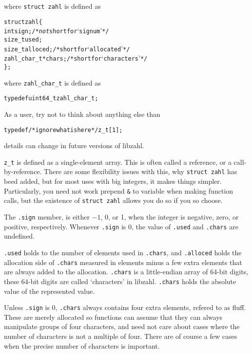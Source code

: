 \noindent
where {\tt struct zahl} is defined as

\begin{alltt}
   struct zahl \{
       int sign;            \textcolor{c}{/* \textrm{\emph{not} short for `signum'} */}
       size_t used;
       size_t alloced;      \textcolor{c}{/* \textrm{short for `allocated'} */}
       zahl_char_t *chars;  \textcolor{c}{/* \textrm{short for `characters'} */}
   \};
\end{alltt}

\noindent
where {\tt zahl\_char\_t} is defined as

\begin{alltt}
   typedef uint64_t zahl_char_t;
\end{alltt}

\noindent
As a user, try not to think about anything else than

\begin{alltt}
   typedef \textcolor{c}{/* \textrm{ignore what is here} */} z_t[1];
\end{alltt}

\noindent
details can change in future versions of libzahl.

{\tt z\_t} is defined as a single-element array. This
is often called a reference, or a call-by-reference.
There are some flexibility issues with this, why
{\tt struct zahl} has beed added, but for most uses
with big integers, it makes things simpler. Particularly,
you need not work prepend {\tt \&} to variable when making
function calls, but the existence of {\tt struct zahl}
allows you do so if you so choose.

The {\tt .sign} member, is either $-1$, 0, or 1,
when the integer is negative, zero, or positive,
respectively. Whenever {\tt .sign} is 0, the value
of {\tt .used} and {\tt .chars} are undefined.

{\tt .used} holds to the number of elements used in
{\tt .chars}, and {\tt .alloced} holds the allocation
side of {\tt .chars} measured in elements minus a few
extra elements that are always added to the allocation.
{\tt .chars} is a little-endian array of 64-bit digits,
these 64-bit digits are called `characters' in libzahl.
{\tt .chars} holds the absolute value of the
represented value.

Unless {\tt .sign} is 0, {\tt .chars} always contains
four extra elements, refered to as fluff. These are
merely allocated so functions can assume that they can
always manipulate groups of four characters, and need
not care about cases where the number of characters is
not a multiple of four. There are of course a few cases
when the precise number of characters is important.


